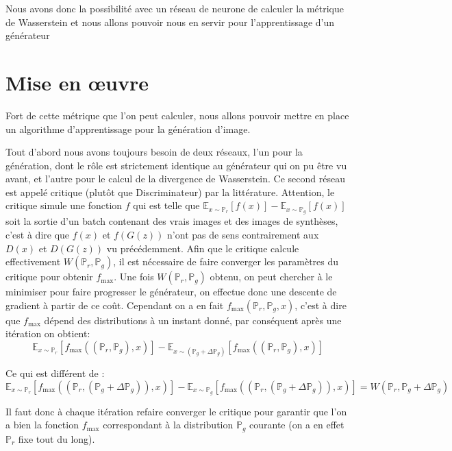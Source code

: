 Nous avons donc la possibilité avec un réseau de neurone de calculer la métrique de Wasserstein et nous allons pouvoir nous en servir pour l'apprentissage d'un générateur

\section{Mise en œuvre}

Fort de cette métrique que l'on peut calculer, nous allons pouvoir mettre en place un algorithme d'apprentissage pour la génération d'image.

Tout d'abord nous avons toujours besoin de deux réseaux, l'un pour la génération, dont le rôle est strictement identique au générateur qui on pu être vu avant, et l'autre pour le calcul de la divergence de Wasserstein. Ce second réseau est appelé critique (plutôt que Discriminateur) par la littérature. Attention, le critique simule une fonction $f$ qui est telle que $\mathbb{E}_{x\sim\mathbb{P}_r}[f(x)] - \mathbb{E}_{x\sim\mathbb{P}_g}[f(x)] $ soit la sortie d'un batch contenant des vrais images et des images de synthèses, c'est à dire que $f(x)$ et $f(G(z))$ n'ont pas de sens contrairement aux $D(x)$ et $D(G(z))$ vu précédemment. 
Afin que le critique calcule effectivement $W(\mathbb{P}_r, \mathbb{P}_g)$, il est nécessaire de faire converger les paramètres du critique pour obtenir $f_{\text{max}}$. Une fois $W(\mathbb{P}_r, \mathbb{P}_g)$ obtenu, on peut chercher à le minimiser pour faire progresser le générateur, on effectue donc une descente de gradient à partir de ce coût. Cependant on a en fait $f_{\text{max}}(\mathbb{P}_r, \mathbb{P}_g, x)$, c'est à dire que $f_{\text{max}}$ dépend des distributions à un instant donné, par conséquent après une itération on obtient:
 \[\mathbb{E}_{x\sim\mathbb{P}_r}[f_\text{max}((\mathbb{P}_r, \mathbb{P}_g), x)] - \mathbb{E}_{x\sim\left(\mathbb{P}_g+\Delta\mathbb{P}_g\right)}[f_\text{max}((\mathbb{P}_r, \mathbb{P}_g), x)] \]

Ce qui est différent de :
 \[ \mathbb{E}_{x\sim\mathbb{P}_r}[f_\text{max}((\mathbb{P}_r, \left(\mathbb{P}_g+\Delta\mathbb{P}_g\right)), x)] - \mathbb{E}_{x\sim \mathbb{P}_g}[f_\text{max}((\mathbb{P}_r, \left(\mathbb{P}_g+\Delta\mathbb{P}_g\right)), x)] = W(\mathbb{P}_r, \mathbb{P}_g+\Delta\mathbb{P}_g)\]

 Il faut donc à chaque itération refaire converger le critique pour garantir que l'on a bien la fonction $f_{\text{max}}$ correspondant à la distribution $\mathbb{P}_g$ courante (on a en effet $\mathbb{P}_r$ fixe tout du long).


